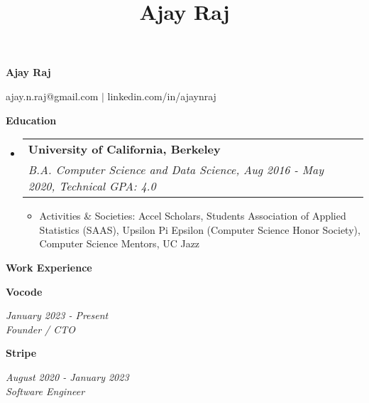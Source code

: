 \documentclass[letterpaper,8pt]{article}
\title{Ajay Raj}
\makeatletter
\newcommand{\resitem}[1]{\item #1 \vspace{-1pt}}
\newcommand{\ressubheading}[4]{
\begin{tabular*}{6.5in}{l@{\extracolsep{\fill}}r}
		\textbf{#1} & #2 \\
		\textit{#3} & \textit{#4} \\
\end{tabular*}\vspace{-6pt}}
\makeatother
\begin{document}
\centerline{\Large{\textbf{Ajay Raj}}}
\centerline{ajay.n.raj@gmail.com $\vert$ linkedin.com/in/ajaynraj}

\vspace{0.1in}
\textbf{\large{Education}}
\normalsize
{\renewcommand\labelitemi{}
\begin{itemize}
\item
	\ressubheading{University of California, Berkeley}{}{\small{B.A. Computer Science and Data Science, Aug 2016 - May 2020, Technical GPA: 4.0}}{}
	\begin{itemize}[topsep=3pt, noitemsep]
		\resitem{Activities \& Societies: Accel Scholars, Students Association of Applied Statistics (SAAS), Upsilon Pi Epsilon (Computer Science Honor Society), Computer Science Mentors, UC Jazz}
	\end{itemize}

\end{itemize}

\textbf{\large{Work Experience}}
\begin{itemize}
  \small{\item
      \textbf{\small{Vocode}}}\hfill{\textit{January 2023 - Present}} \\
      \textit{\small{Founder / CTO}}

  \small{\item
      \textbf{\small{Stripe}}}\hfill{\textit{August 2020 - January 2023}} \\
      \textit{\small{Software Engineer}}


\end{itemize}}
\end{document}
